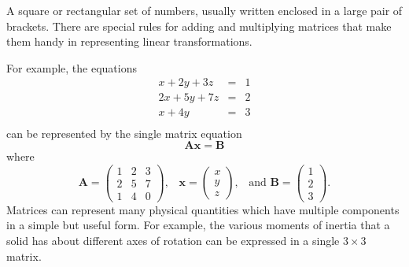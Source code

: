 A square or rectangular set of numbers, usually written enclosed in a large pair of brackets. There are special rules for adding and multiplying matrices that make them handy in representing linear transformations.
\par
For example, the equations 
\begin{eqnarray*}
x + 2y + 3z &=& 1\\
2x + 5y + 7z &=& 2\\
x + 4y &=& 3\\
\end{eqnarray*}
can be represented by the single matrix equation
$$
\mathbf{Ax} = \mathbf{B}
$$
where
$$ \mathbf{A} = \left( 
\begin{array}{ccc}
  1 & 2 & 3 \\
  2 & 5 & 7 \\
  1 & 4 & 0 
\end{array} 
\right )\mbox{,}\quad 
\mathbf{x} = \left(
\begin{array}{c}
  x \\
  y \\
  z 
\end{array} 
\right )\mbox{,}\quad\mbox{and~}   
\mathbf{B} = \left(
\begin{array}{c}
  1 \\
  2 \\
  3 
\end{array} 
\right ).
$$
Matrices can represent many physical quantities which have multiple components in a simple but useful form. For example, the various moments of inertia that a solid has about different axes of rotation can be expressed in a single $3 \times 3$ matrix.
  